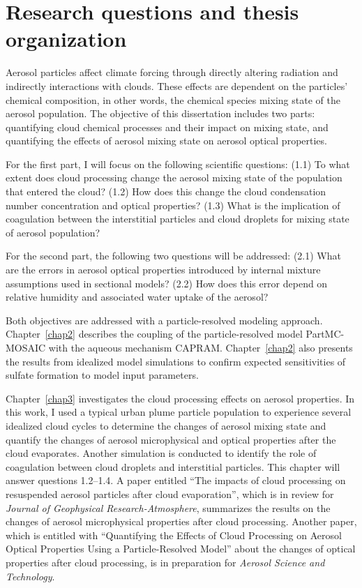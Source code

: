 \documentclass[edeposit,fullpage]{uiucthesis2009}
\begin{document}
\section{Research questions and thesis organization}
Aerosol particles affect climate forcing through directly altering
radiation and indirectly interactions with clouds. These effects are
dependent on the particles' chemical composition, in other words, the
chemical species mixing state of the aerosol population. The objective
of this dissertation includes two parts: quantifying cloud chemical
processes and their impact on mixing state, and quantifying the
effects of aerosol mixing state on aerosol optical properties. 

For the first part, I will focus on the following scientific
questions: (1.1) To what extent does cloud
processing change the aerosol mixing state of the population that
entered the cloud?  (1.2) How does this change the cloud condensation
number concentration and optical properties? (1.3) What is the
implication of coagulation between the interstitial particles and
cloud droplets for mixing state of aerosol population?

For the second part, the following two questions will be addressed:
(2.1) What are the errors in aerosol optical properties introduced by
internal mixture assumptions used in sectional models? (2.2) How does
this error depend on relative humidity and associated water uptake of
the aerosol?

Both objectives are addressed with a particle-resolved modeling
approach. Chapter~\ref{chap2} describes the coupling of the particle-resolved
model PartMC-MOSAIC with the aqueous mechanism
CAPRAM. Chapter~\ref{chap2} also presents the results from idealized
model simulations to confirm expected sensitivities of sulfate
formation to model input parameters.

Chapter~\ref{chap3} investigates the cloud processing effects on aerosol
properties. In this work, I used a typical urban plume particle
population to experience several idealized cloud cycles to determine
the changes of aerosol mixing state and quantify the changes of
aerosol microphysical and optical properties after the cloud
evaporates. Another simulation is conducted to identify the role of
coagulation between cloud droplets and interstitial particles. This
chapter will answer questions 1.2--1.4. A paper entitled ``The impacts
of cloud processing on resuspended aerosol particles after cloud
evaporation'', which is in review for \textit{Journal of Geophysical
  Research-Atmosphere}, summarizes the results on the changes of
aerosol microphysical properties after cloud processing. Another
paper, which is entitled with ``Quantifying the Effects of Cloud
Processing on Aerosol Optical Properties Using a Particle-Resolved
Model'' about the changes of optical properties after cloud
processing, is in preparation for \textit{Aerosol Science and
  Technology}.
\end{document}
